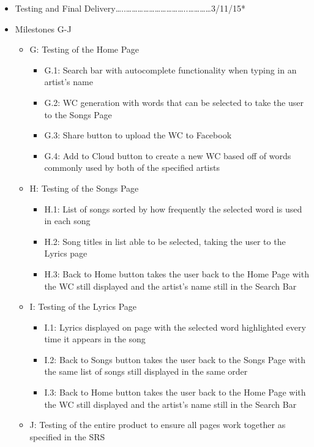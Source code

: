 \documentclass[]{article}
\begin{document}
\begin{itemize}
\itemsep1pt\parskip0pt
\item
  Testing and Final
  Delivery\ldots{}..\ldots{}\ldots{}\ldots{}\ldots{}\ldots{}\ldots{}\ldots{}\ldots{}\ldots{}\ldots{}..\ldots{}\ldots{}\ldots{}\ldots{}3/11/15*
\item
  Milestones G-J

  \begin{itemize}
  \itemsep1pt\parskip0pt
  \item
    G: Testing of the Home Page

    \begin{itemize}
    \itemsep1pt\parskip0pt
    \item
      G.1: Search bar with autocomplete functionality when typing in an
      artist's name
    \item
      G.2: WC generation with words that can be selected to take the
      user to the Songs Page
    \item
      G.3: Share button to upload the WC to Facebook
    \item
      G.4: Add to Cloud button to create a new WC based off of words
      commonly used by both of the specified artists
    \end{itemize}
  \item
    H: Testing of the Songs Page

    \begin{itemize}
    \itemsep1pt\parskip0pt
    \item
      H.1: List of songs sorted by how frequently the selected word is
      used in each song
    \item
      H.2: Song titles in list able to be selected, taking the user to
      the Lyrics page
    \item
      H.3: Back to Home button takes the user back to the Home Page with
      the WC still displayed and the artist's name still in the Search
      Bar
    \end{itemize}
  \item
    I: Testing of the Lyrics Page

    \begin{itemize}
    \itemsep1pt\parskip0pt
    \item
      I.1: Lyrics displayed on page with the selected word highlighted
      every time it appears in the song
    \item
      I.2: Back to Songs button takes the user back to the Songs Page
      with the same list of songs still displayed in the same order
    \item
      I.3: Back to Home button takes the user back to the Home Page with
      the WC still displayed and the artist's name still in the Search
      Bar
    \end{itemize}
  \item
    J: Testing of the entire product to ensure all pages work together
    as specified in the SRS
  \end{itemize}
\end{itemize}
\end{document}
